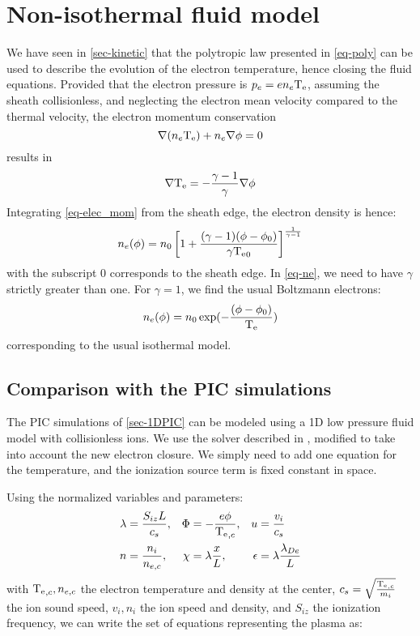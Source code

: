 
\section{Non-isothermal  fluid model }
\label{sec-fluid}

We have seen in \cref{sec-kinetic} that the polytropic law presented in \cref{eq-poly} can be used to describe the evolution of the electron temperature, hence closing the fluid equations.
Provided that the electron pressure is $p_e = e n_e \mathrm{T_e}$, assuming the sheath collisionless, and neglecting the electron mean velocity compared to the thermal velocity, the electron momentum conservation
\begin{equation}
\label{eq-elec_mom}
 \nabla (n_e \mathrm{T_e}) + n_e \nabla \phi = 0
\end{equation}
results in
\begin{equation}
  \label{eq-momentum}
  \nabla \mathrm{T_e} = - \frac{\gamma - 1}{\gamma} \nabla \phi
\end{equation}
Integrating \cref{eq-elec_mom} from the sheath edge, the electron density is hence:
\begin{equation}
  \label{eq-ne}
  n_e(\phi) = n_0 \left[ 1 + \frac{(\gamma - 1) (\phi - \phi_0)}{\gamma \mathrm{T_e}_0}  \right]^{\frac{1}{\gamma - 1}}
\end{equation}
with the subscript $0$ corresponds to the sheath edge.
In \cref{eq-ne}, we need to have $\gamma$ strictly greater than one.
For $\gamma=1$, we find the usual Boltzmann electrons:
\begin{equation}
  n_e(\phi) = n_0 \exp( - \frac{ (\phi - \phi_0)}{\mathrm{T_e}})
\end{equation}
corresponding to the usual isothermal model.

\subsection{Comparison with the PIC simulations}
\label{sec-fluidPIC}
The PIC simulations of \cref{sec-1DPIC} can be modeled using a 1D low pressure fluid model with collisionless ions.
We use the solver described in \citet{riemann2005}, modified to take into account the new electron closure.
We simply need to add one equation for the temperature, and the ionization source term is fixed constant in space.

Using the normalized variables and parameters:
\begin{align}
\lambda &= \frac{S_{iz} L}{c_s}, &\Phi&=-\frac{e \phi}{\mathrm{T_e}_{, c}}, &u &= \frac{v_i}{c_s}\\
n &= \frac{n_i}{n_{e,c}}, &\chi&=\lambda \frac{x}{L}, &\epsilon &= \lambda \frac{\lambda_{De}}{L}\\
\end{align}
with $\mathrm{T_e}_{,c}, n_{e,c}$ the electron temperature and density at the center, $c_s= \sqrt{\frac{\mathrm{T_e}_{,c}}{m_i}}$ the ion sound speed, $v_i, n_i$ the ion speed and density, and $S_{iz}$ the ionization frequency, we can write the set of equations representing the plasma as\citep{riemann2005}:




